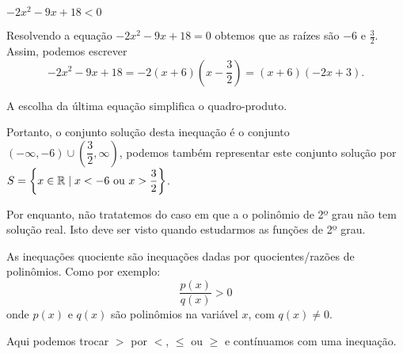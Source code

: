  \begin{exem}
 $-2x^2- 9x + 18 < 0$

  Resolvendo a equação $-2x^2- 9x + 18 = 0$ obtemos que as raízes são $-6$ e $\frac{3}{2}$. Assim, podemos escrever
\begin{equation*}
-2x^2- 9x + 18 = -2 (x+6) (x - \frac{3}{2}) = (x+6) (-2x +3). 
\end{equation*}

A escolha da última equação simplifica o quadro-produto.

 \begin{signtbl}{3}{2}
\end{signtbl}
 
 Portanto, o conjunto solução desta inequação é o conjunto $(-\infty, -6) \cup \left(\dfrac{3}{2}, \infty \right)$, podemos também representar este conjunto solução por $S= \left\{ x \in \mathbb{R} \mid x < -6 \text{ ou } x > \dfrac{3}{2} \right\}$.
 \end{exem}

 Por enquanto, não tratatemos do caso em que a o polinômio de 2º grau não tem solução real. Isto deve ser visto quando estudarmos as funções de 2º grau.


\begin{obs}
  As inequações quociente são inequações dadas por quocientes/razões de polinômios. Como por exemplo:
  \[\dfrac{p(x)}{q(x)} > 0\]
  onde $p(x)$ e $q(x)$ são polinômios na variável $x$, com $q(x) \neq 0$. 
  
  Aqui podemos trocar $>$ por $<$, $\leq$ ou $\geqslant$ e contínuamos com uma inequação.    
\end{obs}
 
